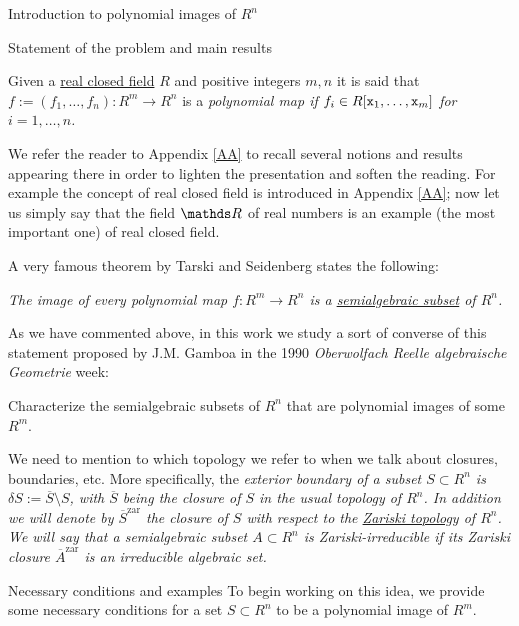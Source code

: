 \documentclass[11pt, a4paper, english, twoside, notitlepage, openright]{report}
\begin{document}
\begin{chapter}{Introduction to polynomial images of $R^n$}
\begin{section}{Statement of the problem and main results}
\begin{definition}\label{polyMap} Given a \hyperref[realCField]{real closed field} $R$ and positive integers $m,n$ it is said that $f:=(f_1,\dots,f_n):R^m\to R^n$ is a \em polynomial map \em if $f_i\in R[{\tt x}_1,\dots,{\tt x}_m]$ for $i=1,\dots,n$. 
\end{definition}

We refer the reader to Appendix \ref{AA} to recall several notions and results appearing there in order to lighten the presentation and soften the reading. For example the concept of real closed field is introduced in Appendix \ref{AA}; now let us simply say that the field $\R$ of real numbers is an example (the most important one) of real closed field. 
	
A very famous theorem by Tarski and Seidenberg states the following:
\begin{theorem}\label{tarskiSeidenberg} \em The image of every polynomial map $f:R^m\to R^n$ is a \hyperref[semialgSet]{semialgebraic subset} of $R^n$. \em
\end{theorem}

As we have commented above, in this work we study a sort of converse of this statement proposed by  J.M. Gamboa \cite{g} in the 1990 \emph{Oberwolfach Reelle algebraische Geometrie} week:
\begin{problem}
Characterize the semialgebraic subsets of $R^n$ that are polynomial images of some $R^m$.
\end{problem}
	
We need to mention to which topology we refer to when we talk about closures, boundaries, etc. More specifically, the \em exterior boundary \em of a subset $S\subset R^n$ is $\delta S:=\overline{S}\setminus S$, with $\overline{S}$ being the \em closure \em of $S$ in the usual topology of $R^n$. In addition we will denote by $\overline{S}^{\text{zar}}$ the closure of $S$ with respect to the \hyperref[zariski]{Zariski topology} of $R^n$. We will say that a semialgebraic subset $A\subset R^n$ is \em Zariski-irreducible \em if its Zariski closure $\overline{A}^{\text{zar}}$ is an irreducible algebraic set.
	
\begin{subsection}{Necessary conditions and examples} To begin working on this idea, we provide some necessary conditions for a set $S\subset R^n$ to be a polynomial image of $R^m$. 
	

\end{subsection}
\end{section}
\end{chapter}
\end{document}
